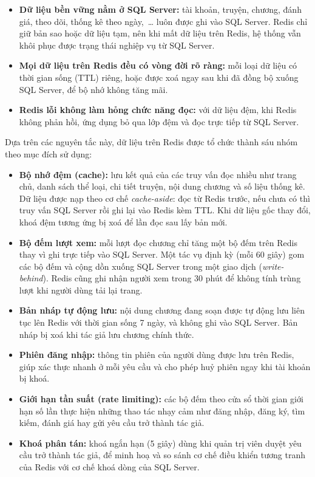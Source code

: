 \begin{itemize}
    \item \textbf{Dữ liệu bền vững nằm ở SQL Server:} tài khoản, truyện, chương, đánh giá, theo dõi, thống kê theo ngày,~\ldots{} luôn được ghi vào SQL Server. Redis chỉ giữ bản sao hoặc dữ liệu tạm, nên khi mất dữ liệu trên Redis, hệ thống vẫn khôi phục được trạng thái nghiệp vụ từ SQL Server.
    \item \textbf{Mọi dữ liệu trên Redis đều có vòng đời rõ ràng:} mỗi loại dữ liệu có thời gian sống (TTL) riêng, hoặc được xoá ngay sau khi đã đồng bộ xuống SQL Server, để bộ nhớ không tăng mãi.
    \item \textbf{Redis lỗi không làm hỏng chức năng đọc:} với dữ liệu đệm, khi Redis không phản hồi, ứng dụng bỏ qua lớp đệm và đọc trực tiếp từ SQL Server.
\end{itemize}

Dựa trên các nguyên tắc này, dữ liệu trên Redis được tổ chức thành sáu nhóm theo mục đích sử dụng:

\begin{itemize}
    \item \textbf{Bộ nhớ đệm (cache):} lưu kết quả của các truy vấn đọc nhiều như trang chủ, danh sách thể loại, chi tiết truyện, nội dung chương và số liệu thống kê. Dữ liệu được nạp theo cơ chế \emph{cache-aside}: đọc từ Redis trước, nếu chưa có thì truy vấn SQL Server rồi ghi lại vào Redis kèm TTL. Khi dữ liệu gốc thay đổi, khoá đệm tương ứng bị xoá để lần đọc sau lấy bản mới.
    \item \textbf{Bộ đếm lượt xem:} mỗi lượt đọc chương chỉ tăng một bộ đếm trên Redis thay vì ghi trực tiếp vào SQL Server. Một tác vụ định kỳ (mỗi 60 giây) gom các bộ đếm và cộng dồn xuống SQL Server trong một giao dịch (\emph{write-behind}). Redis cũng ghi nhận người xem trong 30 phút để không tính trùng lượt khi người dùng tải lại trang.
    \item \textbf{Bản nháp tự động lưu:} nội dung chương đang soạn được tự động lưu liên tục lên Redis với thời gian sống 7 ngày, và không ghi vào SQL Server. Bản nháp bị xoá khi tác giả lưu chương chính thức.
    \item \textbf{Phiên đăng nhập:} thông tin phiên của người dùng được lưu trên Redis, giúp xác thực nhanh ở mỗi yêu cầu và cho phép huỷ phiên ngay khi tài khoản bị khoá.
    \item \textbf{Giới hạn tần suất (rate limiting):} các bộ đếm theo cửa sổ thời gian giới hạn số lần thực hiện những thao tác nhạy cảm như đăng nhập, đăng ký, tìm kiếm, đánh giá hay gửi yêu cầu trở thành tác giả.
    \item \textbf{Khoá phân tán:} khoá ngắn hạn (5 giây) dùng khi quản trị viên duyệt yêu cầu trở thành tác giả, để minh hoạ và so sánh cơ chế điều khiển tương tranh của Redis với cơ chế khoá dòng của SQL Server.
\end{itemize}

